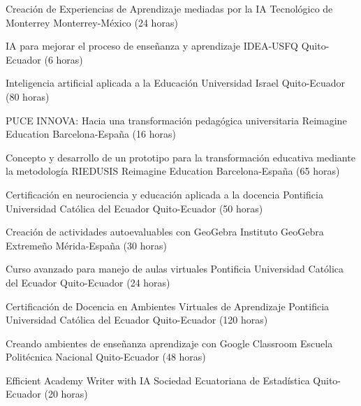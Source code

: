 \documentclass[
	a4paper,
	maincolor=cvblue!70!blue,
	sidecolor=gray!30,
	sectioncolor=cvblue!70!blue,
    sidebarwidth=7.5cm,
	topbottommargin=20pt,
	leftrightmargin=20pt,
]{fortysecondscv}
\begin{document}

    {Creación de Experiencias de Aprendizaje mediadas por la IA}
    {Tecnológico de Monterrey}
    {Monterrey-México (24 horas)}

    {IA para mejorar el proceso de enseñanza y aprendizaje}
    {IDEA-USFQ}
    {Quito-Ecuador (6 horas)}

    {Inteligencia artificial aplicada a la Educación}
    {Universidad Israel}
    {Quito-Ecuador (80 horas)}

    {PUCE INNOVA: Hacia una transformación pedagógica universitaria}
    {Reimagine Education}
    {Barcelona-España (16 horas)}

    {Concepto y desarrollo de un prototipo para la transformación educativa mediante la metodología RIEDUSIS}
    {Reimagine Education}
    {Barcelona-España (65 horas)}

    {Certificación en neurociencia y educación aplicada a la docencia}
    {Pontificia Universidad Católica del Ecuador}
    {Quito-Ecuador (50 horas)}

    {Creación de actividades autoevaluables con GeoGebra}
    {Instituto GeoGebra Extremeño}
    {Mérida-España (30 horas)}

    {Curso avanzado para manejo de aulas virtuales}
    {Pontificia Universidad Católica del Ecuador}
    {Quito-Ecuador (24 horas)}

    {Certificación de Docencia en Ambientes Virtuales de Aprendizaje}
    {Pontificia Universidad Católica del Ecuador}
    {Quito-Ecuador (120 horas)}

    {Creando ambientes de enseñanza aprendizaje con Google Classroom}
    {Escuela Politécnica Nacional}
    {Quito-Ecuador (48 horas)}



    {Efficient Academy Writer with IA}
    {Sociedad Ecuatoriana de Estadística}
    {Quito-Ecuador (20 horas)}
\end{document}
